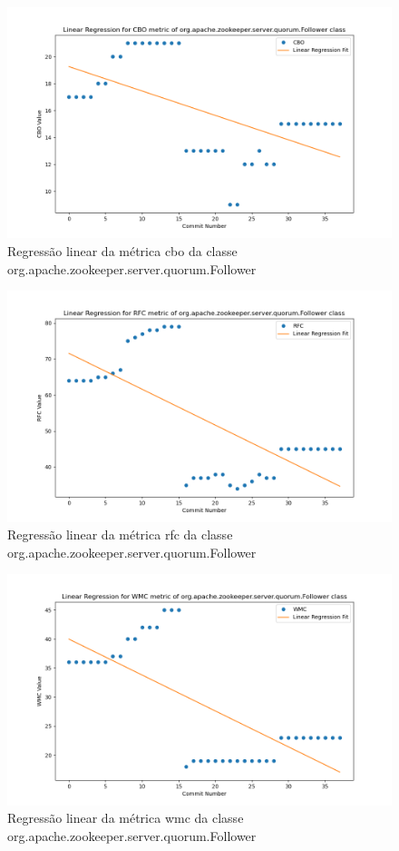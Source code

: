 \begin{figure}[h]
    \centering
    \includegraphics[width=0.8\linewidth]{figuras/Output/Metrics_Predictions/CBO.png}
    \caption{Regressão linear da métrica \gls{cbo} da classe org.apache.zookeeper.server.quorum.Follower}
    \label{fig:RlCBO}
\end{figure}

\begin{figure}[h]
    \centering
    \includegraphics[width=0.8\linewidth]{figuras/Output/Metrics_Predictions/RFC.png}
    \caption{Regressão linear da métrica \gls{rfc} da classe org.apache.zookeeper.server.quorum.Follower}
    \label{fig:RlRFC}
\end{figure}

\begin{figure}[h]
    \centering
    \includegraphics[width=0.8\linewidth]{figuras/Output/Metrics_Predictions/WMC.png}
    \caption{Regressão linear da métrica \gls{wmc} da classe org.apache.zookeeper.server.quorum.Follower}
    \label{fig:RlWMC}
\end{figure}

